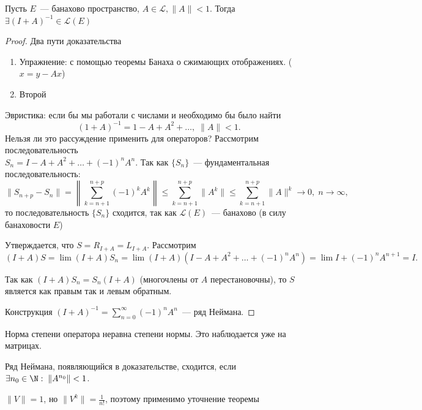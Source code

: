 \begin{theorem}[8.2]\label{theorem8.2}
    Пусть $E$~--- банахово пространство, $A \in \mathcal{L}, \|A\| < 1$. Тогда $\exists (I+A)^{-1} \in \mathcal{L}(E)$ 
\end{theorem}
\begin{proof}
    Два пути доказательства
    \begin{enumerate}
        \item Упражнение: с помощью теоремы Банаха о сжимающих отображениях. ($x=y-Ax$)
        \item Второй
    \end{enumerate}

    Эвристика: если бы мы работали с числами и необходимо бы было найти $$(1 + A)^{-1} = 1 - A + A^2 + \ldots, \; \|A\| < 1.$$
    Нельзя ли это рассуждение применить для операторов? Рассмотрим последовательность\\$S_n = I - A + A^2 + \ldots + (-1)^nA^n$.
    Так как $\{S_n\}$~--- фундаментальная последовательность:
    \[
    \|S_{n + p} - S_n\| = \left\| \sum_{k = n + 1}^{n + p} (-1)^k A^k\right\| \leq \sum_{k = n + 1}^{n + p} \|A^k\| \leq \sum_{k = n + 1}^{n + p} \|A\|^k \to 0,\; n \to \infty,
    \]
    то последовательность $\{S_n\}$ сходится, так как $\mathcal{L}(E)$~--- банахово (в силу банаховости $E$)

    Утверждается, что $S=R_{I+A}=L_{I+A}$. Рассмотрим \[ (I+A)S = \lim (I+A)S_n = \lim (I+A)(I-A+A^2 +\ldots +(-1)^nA^n)=\lim I+(-1)^n A^{n+1}=I. \]

    Так как $(I+A)S_n = S_n(I+A)$ (многочлены от $A$ перестановочны), то $S$ является как правым так и левым обратным.
    
    Конструкция $(I + A)^{-1} = \sum_{n = 0}^\infty (-1)^n A^n$~--- ряд Неймана.
\end{proof}

\begin{lemmanote}
    Норма степени оператора неравна степени нормы. Это наблюдается уже на матрицах.
\end{lemmanote}

\begin{lemmanote}
Ряд Неймана, появляющийся в доказательстве, сходится, если $\exists n_0 \in \N:\; \|A^{n_0}\| < 1$.
\end{lemmanote}

\begin{example}
    $\|V\|=1$, но $\|V^k\|=\frac 1 {n!}$, поэтому применимо уточнение теоремы
\end{example}

